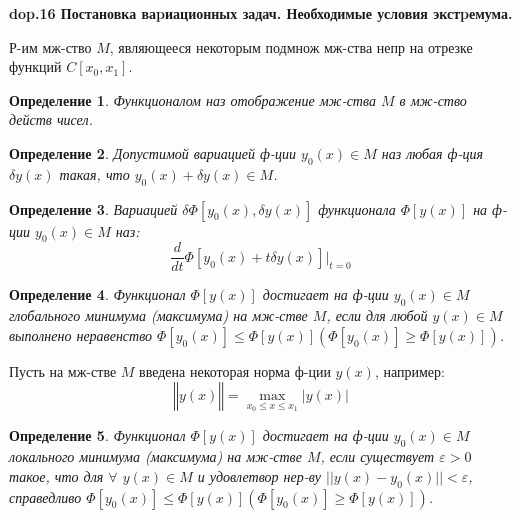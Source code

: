 \documentclass{article}
\newtheorem{definition}{Определение}
\begin{document}
\textbf{\LARGE dop.16 Постановка ваpиационных задач. Необходимые условия экстpемума.}

Р-им мж-ство $M$, являющееся некоторым подмнож
мж-ства непр на отрезке функций $C[x_0, x_1]$.

\begin{definition}
    Функционалом наз отображение мж-ства $M$ в мж-ство действ чисел.
\end{definition}

\begin{definition}
    Допустимой вариацией ф-ции $y_0(x) \in M$ наз любая ф-ция $\delta y(x)$ такая, что $y_0(x) + \delta y(x) \in M$.
\end{definition}

\begin{definition}
    Вариацией $\delta\Phi[y_0(x), \delta y(x)]$ функционала
    $\Phi[y(x)]$ на ф-ции $y_0(x) \in M$ наз: $$\frac{d}{dt}\Phi[y_0(x)+t\delta y(x)]\Big|_{t=0}$$
\end{definition}

\begin{definition}
    Функционал $\Phi[y(x)]$ достигает на ф-ции
    $y_0(x) \in M$ глобального минимума (максимума) на мж-стве $M$, если для любой $y(x) \in M$ выполнено неравенство $\Phi[y_0(x)]\leq\Phi[y(x)]  (\Phi[y_0(x)]\geq\Phi[y(x)])$.
\end{definition}

Пусть на мж-стве $M$ введена некоторая норма ф-ции $y(x)$, например:
$$‖y(x)‖=\displaystyle\max_{x_0\leq x \leq x_1} |y(x)|$$

\begin{definition}
    Функционал $\Phi[y(x)]$ достигает на ф-ции
    $y_0(x)\in M$ локального минимума (максимума) на мж-стве $M$, если
    существует $\varepsilon > 0$ такое, что для $\forall$ $y(x) \in M$ и удовлетвор нер-ву $||y(x) - y_0(x)|| < \varepsilon$, справедливо $\Phi[y_0(x)] \leq \Phi[y(x)] (\Phi[y_0(x)] \geq \Phi[y(x)])$.
\end{definition}
\end{document}
